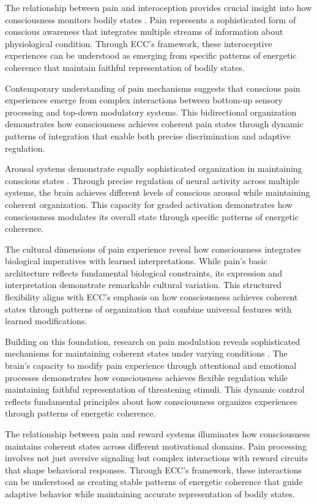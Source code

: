 \begin{refsection}
The relationship between pain and interoception provides crucial insight into how consciousness monitors bodily states \cite{Craig2003}. Pain represents a sophisticated form of conscious awareness that integrates multiple streams of information about physiological condition. Through ECC's framework, these interoceptive experiences can be understood as emerging from specific patterns of energetic coherence that maintain faithful representation of bodily states.

Contemporary understanding of pain mechanisms \cite{Garland2012} suggests that conscious pain experiences emerge from complex interactions between bottom-up sensory processing and top-down modulatory systems. This bidirectional organization demonstrates how consciousness achieves coherent pain states through dynamic patterns of integration that enable both precise discrimination and adaptive regulation.

Arousal systems demonstrate equally sophisticated organization in maintaining conscious states \cite{Pfaff2006}. Through precise regulation of neural activity across multiple systems, the brain achieves different levels of conscious arousal while maintaining coherent organization. This capacity for graded activation demonstrates how consciousness modulates its overall state through specific patterns of energetic coherence.

The cultural dimensions of pain experience \cite{Morris1991} reveal how consciousness integrates biological imperatives with learned interpretations. While pain's basic architecture reflects fundamental biological constraints, its expression and interpretation demonstrate remarkable cultural variation. This structured flexibility aligns with ECC's emphasis on how consciousness achieves coherent states through patterns of organization that combine universal features with learned modifications.

Building on this foundation, research on pain modulation reveals sophisticated mechanisms for maintaining coherent states under varying conditions \cite{Wiech2008}. The brain's capacity to modify pain experience through attentional and emotional processes demonstrates how consciousness achieves flexible regulation while maintaining faithful representation of threatening stimuli. This dynamic control reflects fundamental principles about how consciousness organizes experiences through patterns of energetic coherence.

The relationship between pain and reward systems \cite{Fields2007} illuminates how consciousness maintains coherent states across different motivational domains. Pain processing involves not just aversive signaling but complex interactions with reward circuits that shape behavioral responses. Through ECC's framework, these interactions can be understood as creating stable patterns of energetic coherence that guide adaptive behavior while maintaining accurate representation of bodily states.


\end{refsection}
